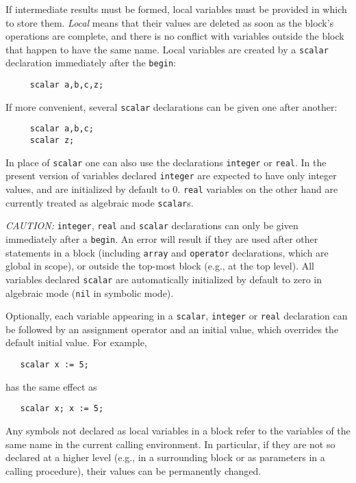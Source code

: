 \hypertarget{command:SCALAR}{}
\hypertarget{command:INTEGER}{}
\hypertarget{command:REAL}{}

If intermediate results must be formed, local variables must be provided
in which to store them. \emph{Local} means that their values are deleted as
soon as the block's operations are complete, and there is no conflict with
variables outside the block that happen to have the same name.  Local
variables are created by a \texttt{scalar} declaration
immediately after the \texttt{begin}:
\begin{verbatim}
     scalar a,b,c,z;
\end{verbatim}
If more convenient, several \texttt{scalar} declarations can be given one after
another:
\begin{verbatim}
     scalar a,b,c;
     scalar z;
\end{verbatim}
In place of \texttt{scalar} one can also use the declarations
\texttt{integer} or \texttt{real}.
In the present version of {\REDUCE} variables declared \texttt{integer}
are expected to have only integer values, and are initialized by default to 0.
\texttt{real} variables on the other hand are currently treated as algebraic
mode \texttt{scalar}s.

\textit{CAUTION:} \texttt{integer}, \texttt{real} and \texttt{scalar} declarations can
only be given immediately after a \texttt{begin}.  An error will result if
they are used after other statements in a block (including \texttt{array} and
\texttt{operator} declarations, which are global in scope), or outside the
top-most block (e.g., at the top level).  All variables declared
\texttt{scalar} are automatically initialized by default to zero in algebraic mode
(\texttt{nil} in symbolic mode).

Optionally, each variable appearing in a \texttt{scalar},
\texttt{integer} or \texttt{real} declaration can be followed by an
assignment operator and an initial value, which overrides the default
initial value. For example,
\begin{verbatim}
   scalar x := 5;
\end{verbatim}
has the same effect as
\begin{verbatim}
   scalar x; x := 5;
\end{verbatim}
Any symbols not declared as local variables in a block refer to the
variables of the same name in the current calling environment. In
particular, if they are not so declared at a higher level (e.g., in a
surrounding block or as parameters in a calling procedure), their values can
be permanently changed.

